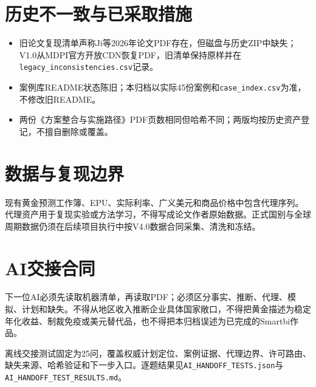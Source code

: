 \documentclass[UTF8,openany,oneside,11pt]{ctexbook}
\begin{document}
\chapter{历史不一致与已采取措施}
\begin{itemize}[leftmargin=2.5em]
\item 旧论文复现清单声称Ji等2026年论文PDF存在，但磁盘与历史ZIP中缺失；V1.0从MDPI官方开放CDN恢复PDF，旧清单保持原样并在\texttt{legacy\_inconsistencies.csv}记录。
\item 案例库README状态陈旧；本归档以实际45份案例和\texttt{case\_index.csv}为准，不修改旧README。
\item 两份《方案整合与实施路径》PDF页数相同但哈希不同；两版均按历史资产登记，不擅自删除或覆盖。
\end{itemize}

\chapter{数据与复现边界}
现有黄金预测工作簿、EPU、实际利率、广义美元和商品价格中包含代理序列。代理资产用于复现实验或方法学习，不得写成论文作者原始数据。正式国别与全球周期数据仍须在后续项目执行中按V4.0数据合同采集、清洗和冻结。

\chapter{AI交接合同}
下一位AI必须先读取机器清单，再读取PDF；必须区分事实、推断、代理、模拟、计划和缺失。不得从地区收入推断企业具体国家敞口，不得把黄金描述为稳定年化收益、制裁免疫或美元替代品，也不得把本归档误述为已完成的Smartbi作品。

离线交接测试固定为25问，覆盖权威计划定位、案例证据、代理边界、许可路由、缺失来源、哈希验证和下一步入口。逐题结果见\texttt{AI\_HANDOFF\_TESTS.json}与\texttt{AI\_HANDOFF\_TEST\_RESULTS.md}。

\nocite{*}
\printbibliography[heading=bibintoc,title={外部来源目录}]

\appendix
\end{document}
